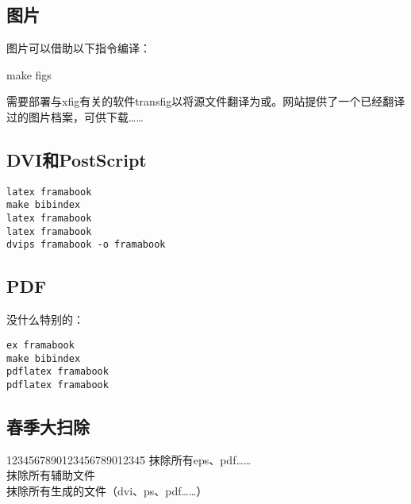 \subsection{图片}

图片可以借助以下指令编译：

\begin{dmd}
make figs
\end{dmd}

\begin{exclamation}
需要部署与xfig有关的软件transfig以将源文件翻译为或。网站\linebreak {}提供了一个已经翻译过的图片档案，可供下载……
\end{exclamation}

\subsection{DVI和PostScript}

\begin{verbatim}
latex framabook
make bibindex
latex framabook
latex framabook
dvips framabook -o framabook
\end{verbatim}

\subsection{PDF}

没什么特别的：

\begin{verbatim}
ex framabook 
make bibindex 
pdflatex framabook 
pdflatex framabook
\end{verbatim}

\subsection{春季大扫除}

\begin{tabbing}
1234567890123456789012345\= \kill
{}\> \leftarrow 抹除所有eps、pdf……\\
\> \leftarrow 抹除所有辅助文件\\
\> \leftarrow 抹除所有生成的文件（dvi、ps、pdf……）
\end{tabbing}
